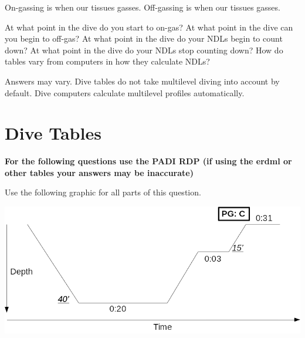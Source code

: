 \documentclass[12pt,letter]{exam}
\begin{document}
\begin{questions}
        \question On-gassing is when our tissues \fillin[absorb] gasses.
        \question Off-gassing is when our tissues \fillin[release] gasses.

        \question At what point in the dive do you start to on-gas? 
        \question At what point in the dive can you begin to off-gas? 
        \question At what point in the dive do your NDLs begin to count down? 
        \question At what point in the dive do your NDLs stop counting down? 
        \question How do tables vary from computers in how they calculate NDLs?
        \begin{solution}[2in]
            Answers may vary. Dive tables do not take multilevel diving into account by default. Dive computers calculate multilevel profiles automatically.
        \end{solution}

\section{Dive Tables}
\textbf{For the following questions use the PADI RDP (if using the erdml or other tables your answers may be inaccurate)}

        \question Use the following graphic for all parts of this question.

        \includegraphics[width=\textwidth]{img/profile.png}
\end{questions}
\end{document}
